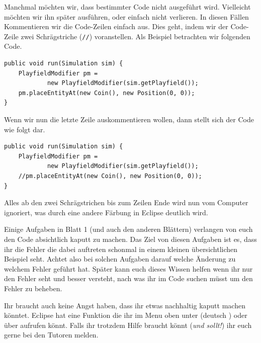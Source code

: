 \begin{Infobox}
    Manchmal möchten wir, dass bestimmter Code nicht ausgeführt wird. Vielleicht möchten wir ihn später ausführen, oder einfach nicht verlieren.
    In diesen Fällen Kommentieren wir die Code-Zeilen einfach aus.
    Dies geht, indem wir der Code-Zeile zwei Schrägstriche (\lstinline{//}) voranstellen.
    Als Beispiel betrachten wir folgenden Code.\\

    \hfill
    \begin{minipage}{.96\textwidth}
        \begin{lstlisting}
public void run(Simulation sim) {
    PlayfieldModifier pm =
            new PlayfieldModifier(sim.getPlayfield());
    pm.placeEntityAt(new Coin(), new Position(0, 0));
}
        \end{lstlisting}
    \end{minipage}

    Wenn wir nun die letzte Zeile auskommentieren wollen, dann stellt sich der Code wie folgt dar.\\

    \hfill
    \begin{minipage}{.96\textwidth}
        \begin{lstlisting}
public void run(Simulation sim) {
    PlayfieldModifier pm =
            new PlayfieldModifier(sim.getPlayfield());
    //pm.placeEntityAt(new Coin(), new Position(0, 0));
}
        \end{lstlisting}
    \end{minipage}

    Alles ab den zwei Schrägstrichen bis zum Zeilen Ende wird nun vom Computer ignoriert, was durch eine andere Färbung in Eclipse deutlich wird.
\end{Infobox}


\begin{Infobox}[Fehler]
    Einige Aufgaben in Blatt 1 (und auch den anderen Blättern) verlangen von euch den Code absichtlich kaputt zu machen.
    Das Ziel von diesen Aufgaben ist es, dass ihr die Fehler die dabei auftreten schonmal in einem kleinen übersichtlichen Beispiel seht.
    Achtet also bei solchen Aufgaben darauf welche Änderung zu welchem Fehler geführt hat.
    Später kann euch dieses Wissen helfen wenn ihr nur den Fehler seht und besser versteht, nach was ihr im Code suchen müsst um den Fehler zu beheben.

    Ihr braucht auch keine Angst haben, dass ihr etwas nachhaltig kaputt machen könntet.
    Eclipse hat eine  Funktion die ihr im Menu oben unter  (deutsch ) oder über  aufrufen könnt.
    Falls ihr trotzdem Hilfe braucht könnt (\emph{und sollt!}) ihr euch gerne bei den Tutoren melden.
\end{Infobox}


